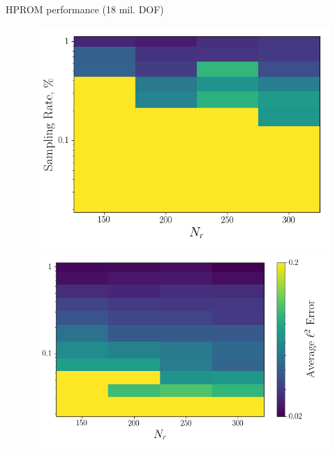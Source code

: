 \documentclass[]{beamer}
\begin{document}
\begin{frame}{HPROM performance (18 mil. DOF)}
	\begin{figure}
		\begin{minipage}{0.35\linewidth}
			\includegraphics[width=0.99\linewidth]{Images/experiments/cvrc/err_contour_random_dt5e-7.png}
		\end{minipage}
		\begin{minipage}{0.4\linewidth}
			\includegraphics[width=0.99\linewidth]{Images/experiments/cvrc/err_contour_eigenvec_dt5e-7.png}
		\end{minipage}
	

\end{figure}
\end{frame}
\end{document}
